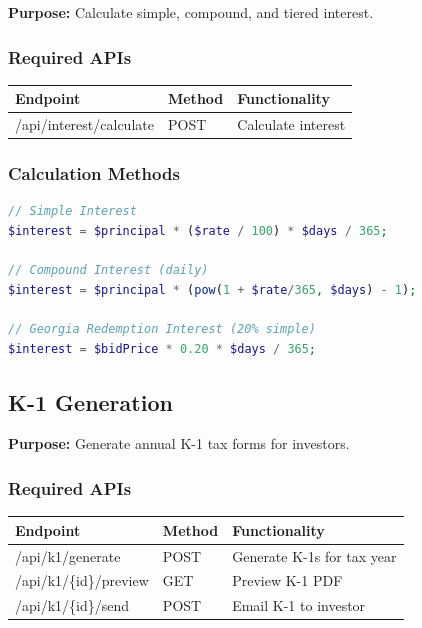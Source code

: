 \documentclass[11pt,a4paper]{article}
\begin{document}
\textbf{Purpose:} Calculate simple, compound, and tiered interest.

\subsubsection{Required APIs}

\begin{longtable}{|p{5cm}|p{2cm}|p{6cm}|}
\hline
\textbf{Endpoint} & \textbf{Method} & \textbf{Functionality} \\
\hline
/api/interest/calculate & POST & Calculate interest \\
\hline
\end{longtable}

\subsubsection{Calculation Methods}
\begin{lstlisting}[language=php]
// Simple Interest
$interest = $principal * ($rate / 100) * $days / 365;

// Compound Interest (daily)
$interest = $principal * (pow(1 + $rate/365, $days) - 1);

// Georgia Redemption Interest (20% simple)
$interest = $bidPrice * 0.20 * $days / 365;
\end{lstlisting}

\subsection{K-1 Generation}

\textbf{Purpose:} Generate annual K-1 tax forms for investors.

\subsubsection{Required APIs}

\begin{longtable}{|p{5cm}|p{2cm}|p{6cm}|}
\hline
\textbf{Endpoint} & \textbf{Method} & \textbf{Functionality} \\
\hline
/api/k1/generate & POST & Generate K-1s for tax year \\
/api/k1/\{id\}/preview & GET & Preview K-1 PDF \\
/api/k1/\{id\}/send & POST & Email K-1 to investor \\
\hline
\end{longtable}

\newpage
\end{document}
